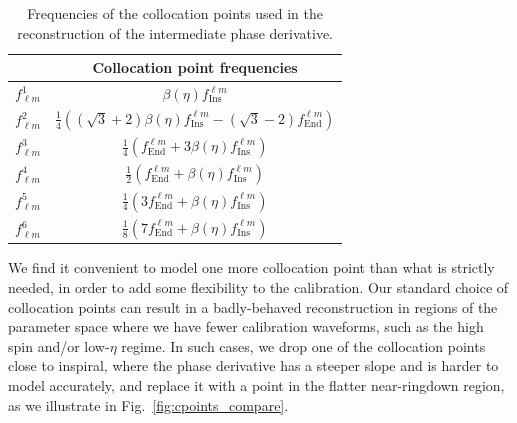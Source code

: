 \documentclass[twocolumn,prd,aps,superscriptaddress,preprintnumbers,tightenlines,showpacs,nofootinbib,eqsecnum,amsfonts,amsmath]{revtex4}
\begin{document}
\begin{table}[h!]
\caption{Frequencies of the collocation points used in the reconstruction of the intermediate phase derivative.}
\label{tab:inter_phase_cpoints}
\begin{center}
{\renewcommand{\arraystretch}{1.5}
\begin{tabular}{| c | c | }
\hline
& Collocation point frequencies \\
\hline
   $f^{1}_{\ell m}$ & $\beta(\eta)f_{\mathrm{Ins}}^{\ell m}$ \\
\hline
   $f^{2}_{\ell m}$ & $\frac{1}{4} \left(\left(\sqrt{3}+2\right) \beta(\eta)f_{\mathrm{Ins}}^{\ell m}-\left(\sqrt{3}-2\right) f^{\ell m}_{\mathrm{End}}\right)$ \\  
   \hline
   $f^{3}_{\ell m}$ & $\frac{1}{4} ( f_{\mathrm{End}}^{\ell m}+3 \beta(\eta)f_{\mathrm{Ins}}^{\ell m})$ \\  
   \hline
   $f^{4}_{\ell m}$ &$\frac{1}{2} ( f^{\ell m}_{\mathrm{End}}+\beta(\eta)f_{\mathrm{Ins}}^{\ell m}) $ \\  
   \hline
   $f^{5}_{\ell m}$ &$\frac{1}{4} (3 f_{\mathrm{End}}^{\ell m}+\beta(\eta)f_{\mathrm{Ins}}^{\ell m})$ \\  
   \hline
   $f^{6}_{\ell m}$ &$\frac{1}{8} (7 f_{\mathrm{End}}^{\ell m}+\beta(\eta)f_{\mathrm{Ins}}^{\ell m})$ \\  
   \hline
\end{tabular}
}
\end{center}
\end{table}




We find it convenient to model one more collocation point than what is strictly needed, in order to add some flexibility to the calibration. Our standard choice of collocation points can result in a badly-behaved reconstruction in regions of the parameter space where we have fewer calibration waveforms, such as the high spin and/or low-$\eta$ regime. In such cases, we drop one of the collocation points close to inspiral, where the phase derivative has a steeper slope and is harder to model accurately, and replace it with a point in the flatter near-ringdown region, as we illustrate in Fig.~\ref{fig:cpoints_compare}.
\end{document}
